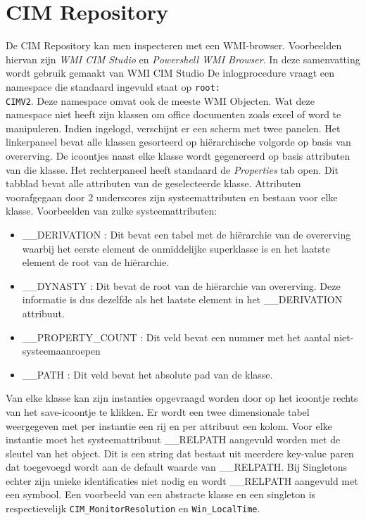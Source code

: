 \documentclass{report}
\begin{document}
	\section{CIM Repository}
	De CIM Repository kan men inspecteren met een WMI-browser. Voorbeelden hiervan zijn \textit{WMI CIM Studio} en \textit{Powershell WMI Browser}. In deze samenvatting wordt gebruik gemaakt van WMI CIM Studio
	De inlogprocedure vraagt een namespace die standaard ingevuld staat op \texttt{root:\\CIMV2}. Deze namespace omvat ook de meeste WMI Objecten. Wat deze namespace niet heeft zijn klassen om office documenten zoals excel of word te manipuleren.
	Indien ingelogd, verschijnt er een scherm met twee panelen. Het linkerpaneel bevat alle klassen gesorteerd op hiërarchische volgorde op basis van overerving. De icoontjes naast elke klasse wordt gegenereerd op basis attributen van die klasse.
	Het rechterpaneel heeft standaard de \textit{Properties} tab open. Dit tabblad bevat alle attributen van de geselecteerde klasse. Attributen voorafgegaan door 2 underscores zijn systeemattributen en bestaan voor elke klasse.
	Voorbeelden van zulke systeemattributen:
	\begin{itemize}
		\item \_\_DERIVATION : Dit bevat een tabel met de hiërarchie van de overerving waarbij het eerste element de onmiddelijke superklasse is en het laatste element de root van de hiërarchie.
		\item \_\_DYNASTY : Dit bevat de root van de hiërarchie van overerving. Deze informatie is dus dezelfde als het laatste element in het \_\_DERIVATION attribuut.
		\item \_\_PROPERTY_COUNT : Dit veld bevat een nummer met het aantal niet-systeemaanroepen
		\item \_\_PATH : Dit veld bevat het absolute pad van de klasse.
	\end{itemize}
	Van elke klasse kan zijn instanties opgevraagd worden door op het icoontje rechts van het save-icoontje te klikken. Er wordt een twee dimensionale tabel weergegeven met per instantie een rij en per attribuut een kolom.
	Voor elke instantie moet het systeemattribuut \_\_RELPATH aangevuld worden met de sleutel van het object. Dit is een string dat bestaat uit meerdere key-value paren dat toegevoegd wordt aan de default waarde van \_\_RELPATH.
	Bij Singletons echter zijn unieke identificaties niet nodig en wordt \_\_RELPATH aangevuld met een \@ symbool. Een voorbeeld van een abstracte klasse en een singleton is respectievelijk \texttt{CIM_MonitorResolution} en \texttt{Win_LocalTime}. 
\end{document}
